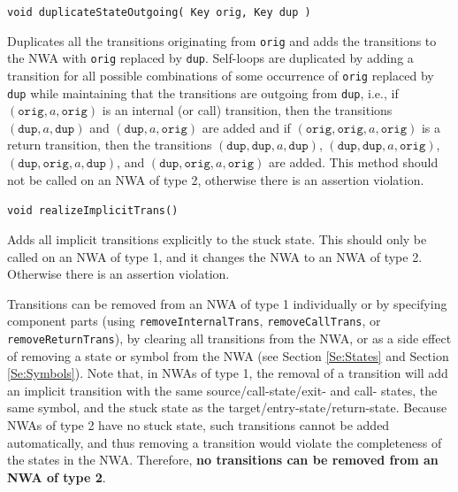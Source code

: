 \documentclass{llncs}
\begin{document}
\begin{description}
  \item\texttt{void duplicateStateOutgoing( Key orig, Key dup )} \nopagebreak

    Duplicates all the transitions originating from \texttt{orig} and adds
    the transitions to the NWA with \texttt{orig} replaced by \texttt{dup}.
    Self-loops are duplicated by adding a transition for all possible
    combinations of some occurrence of \texttt{orig} replaced by \texttt{dup}
    while maintaining that the transitions are outgoing from \texttt{dup},
    i.e., if $(\texttt{orig},a,\texttt{orig})$ is an internal (or call)
    transition, then the transitions $(\texttt{dup},a,\texttt{dup})$ and
    $(\texttt{dup},a,\texttt{orig})$ are added and if
    $(\texttt{orig},\texttt{orig},a,\texttt{orig})$ is a return transition,
    then the transitions $(\texttt{dup},\texttt{dup},a,\texttt{dup})$,
    $(\texttt{dup},\texttt{dup},a,\texttt{orig})$,
    $(\texttt{dup},\texttt{orig},a,\texttt{dup})$, and
    $(\texttt{dup},\texttt{orig},a,\texttt{orig})$ are added.  This method
    should not be called on an NWA of type 2, otherwise there is an assertion
    violation.

  \item\texttt{void realizeImplicitTrans()} \nopagebreak

    Adds all implicit transitions explicitly to the stuck state.  This should
    only be called on an NWA of type 1, and it changes the NWA to an NWA of
    type 2.  Otherwise there is an assertion violation. \\

\end{description} 

Transitions can be removed from an NWA of type 1 individually or by
specifying component parts (using \texttt{removeInternalTrans},
\texttt{removeCallTrans}, or \texttt{removeReturnTrans}), by clearing all
transitions from the NWA, or as a side effect of removing a state or symbol
from the NWA (see Section \ref{Se:States} and Section \ref{Se:Symbols}).
Note that, in NWAs of type 1, the removal of a transition will add an
implicit transition with the same source/call-state/exit- and call- states,
the same symbol, and the stuck state as the target/entry-state/return-state.
Because NWAs of type 2 have no stuck state, such transitions cannot be added
automatically, and thus removing a transition would violate the completeness
of the states in the NWA.  Therefore, \textbf{no transitions can be removed
  from an NWA of type 2}. \\
\end{document}
